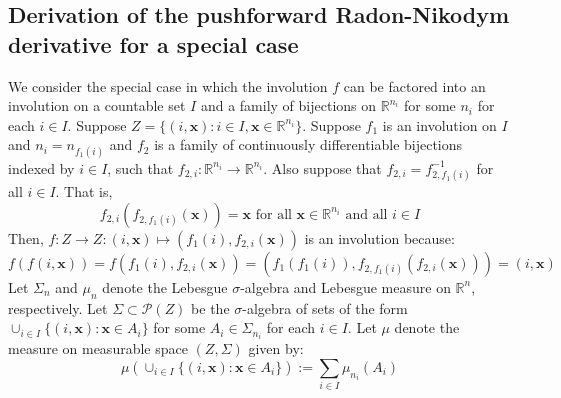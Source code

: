 \documentclass[twoside]{article}
\begin{document}
\subsection{Derivation of the pushforward Radon-Nikodym derivative for a special case}
We consider the special case in which the involution $f$ can be factored into an involution on a countable set $I$ and a family of bijections on $\mathbb{R}^{n_i}$ for some $n_i$ for each $i \in I$.
Suppose $Z = \{(i, \mathbf{x}) : i \in I, \mathbf{x} \in \mathbb{R}^{n_i}\}$.
Suppose $f_1$ is an involution on $I$ and $n_i = n_{f_1(i)}$ and $f_2$ is a family of continuously differentiable bijections indexed by $i \in I$, such that $f_{2,i} : \mathbb{R}^{n_i} \to \mathbb{R}^{n_i}$.
Also suppose that $f_{2,i} = f_{2,f_1(i)}^{-1}$ for all $i \in I$. That is,
\begin{equation}
f_{2,i}(f_{2,f_1(i)}(\mathbf{x})) = \mathbf{x} \mbox{ for all } \mathbf{x} \in \mathbb{R}^{n_i} \mbox{ and all } i \in I
\end{equation} 
Then, $f : Z \to Z : (i, \mathbf{x}) \mapsto (f_1(i), f_{2,i}(\mathbf{x}))$ is an involution because:
\begin{equation}
f(f(i, \mathbf{x})) = f(f_1(i), f_{2,i}(\mathbf{x})) = (f_1(f_1(i)), f_{2,f_1(i)}(f_{2,i}(\mathbf{x}))) = (i, \mathbf{x})
\end{equation}
Let $\Sigma_n$ and $\mu_n$ denote the Lebesgue $\sigma$-algebra and Lebesgue measure on $\mathbb{R}^n$, respectively.
Let $\Sigma \subset \mathcal{P}(Z)$ be the $\sigma$-algebra of sets of the form $\cup_{i \in I} \{(i, \mathbf{x}) : \mathbf{x} \in A_i\}$ for some $A_i \in \Sigma_{n_i}$ for each $i \in I$.
Let $\mu$ denote the measure on measurable space $(Z, \Sigma)$ given by:%
\begin{equation}
\mu(\cup_{i \in I} \{(i, \mathbf{x}) : \mathbf{x} \in A_i\}) := \sum_{i \in I} \mu_{n_i}(A_i)
\end{equation}
\end{document}

